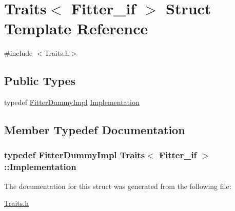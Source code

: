 \hypertarget{struct_traits_3_01_fitter__if_01_4}{}\section{Traits$<$ Fitter\+\_\+if $>$ Struct Template Reference}
\label{struct_traits_3_01_fitter__if_01_4}


{\ttfamily \#include $<$Traits.\+h$>$}

\subsection*{Public Types}
\begin{DoxyCompactItemize}
\item 
typedef \hyperlink{class_fitter_dummy_impl}{Fitter\+Dummy\+Impl} \hyperlink{struct_traits_3_01_fitter__if_01_4_a19708aec36c7f3193ea446893e3a80bc}{Implementation}
\end{DoxyCompactItemize}


\subsection{Member Typedef Documentation}
\subsubsection[{\texorpdfstring{Implementation}{Implementation}}]{\setlength{\rightskip}{0pt plus 5cm}typedef {\bf Fitter\+Dummy\+Impl} {\bf Traits}$<$ {\bf Fitter\+\_\+if} $>$\+::{\bf Implementation}}\hypertarget{struct_traits_3_01_fitter__if_01_4_a19708aec36c7f3193ea446893e3a80bc}{}\label{struct_traits_3_01_fitter__if_01_4_a19708aec36c7f3193ea446893e3a80bc}


The documentation for this struct was generated from the following file\+:\begin{DoxyCompactItemize}
\item 
\hyperlink{_traits_8h}{Traits.\+h}\end{DoxyCompactItemize}

